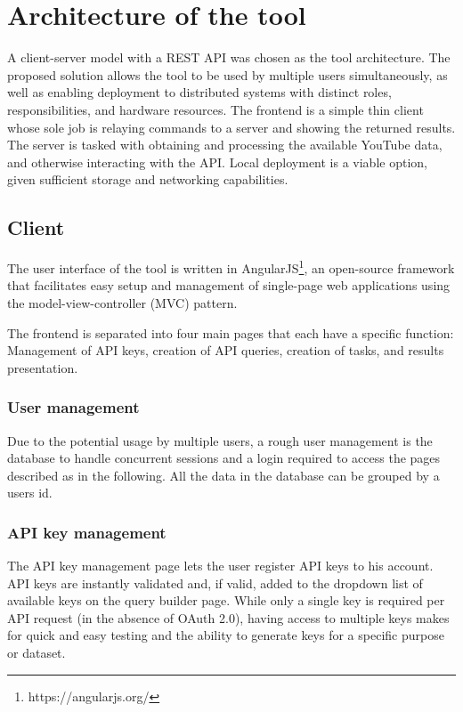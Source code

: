 \section{Architecture of the tool}
A client-server model with a REST API was chosen as the tool architecture. The
proposed solution allows the tool to be used by multiple users simultaneously,
as well as enabling deployment to distributed systems with distinct roles,
responsibilities, and hardware resources.
The frontend is a simple thin client whose sole job is relaying commands to a
server and showing the returned results. The server is tasked with obtaining
and processing the available YouTube data, and otherwise interacting with the
API.
Local deployment is a viable option, given sufficient storage and networking
capabilities.


\subsection{Client}
The user interface of the tool is written in
AngularJS\footnote{https://angularjs.org/}, an open-source framework that
facilitates easy setup and management of single-page web applications using the
model-view-controller (MVC) pattern.

The frontend is separated into four main pages that each have a specific
function: Management of API keys, creation of API queries, creation of tasks,
and results presentation.

\subsubsection{User management}
Due to the potential usage by multiple users, a rough user management is the 
database to handle concurrent sessions and a login required to access the pages
described as in the following. All the data in the database can be grouped by
a users id.

\subsubsection{API key management}
The API key management page lets the user register API keys to his account.
API keys are instantly validated and, if valid, added to the dropdown list of
available keys on the query builder page.
While only a single key is required per API request (in the absence of OAuth
2.0), having access to multiple keys makes for quick and easy testing and the
ability to generate keys for a specific purpose or dataset.

